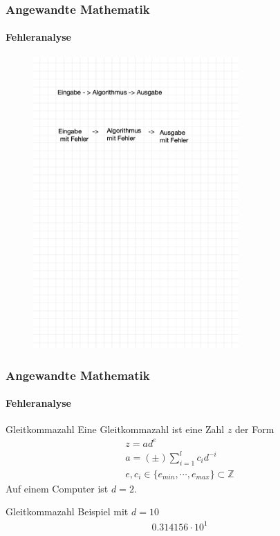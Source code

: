 \documentclass{beamer}
\begin{document}
\begin{frame}
    \frametitle{Angewandte Mathematik}
\framesubtitle{Fehleranalyse}
\begin{figure}[H]
      \centering
    \includegraphics[width=0.7\textwidth]{images/fehler}\end{figure}
 \end{frame}


\begin{frame}
    \frametitle{Angewandte Mathematik}
\framesubtitle{Fehleranalyse}
    \begin{block}{Gleitkommazahl}
Eine Gleitkommazahl ist eine Zahl $z$ der Form
\begin{align*}
z = a d^e \\
a = (\pm) \sum_{i=1}^l c_i d^{-i} \\
e, c_i \in \{e_{min}, \cdots , e_{max}  \} \subset \mathbb{Z}
\end{align*}
Auf einem Computer ist $d=2$.
\end{block}

    \begin{block}{Gleitkommazahl}
Beispiel mit  $d= 10$ 
\begin{align*}
0.314156 \cdot 10^1
\end{align*}
\end{block}

 \end{frame}
\end{document}
